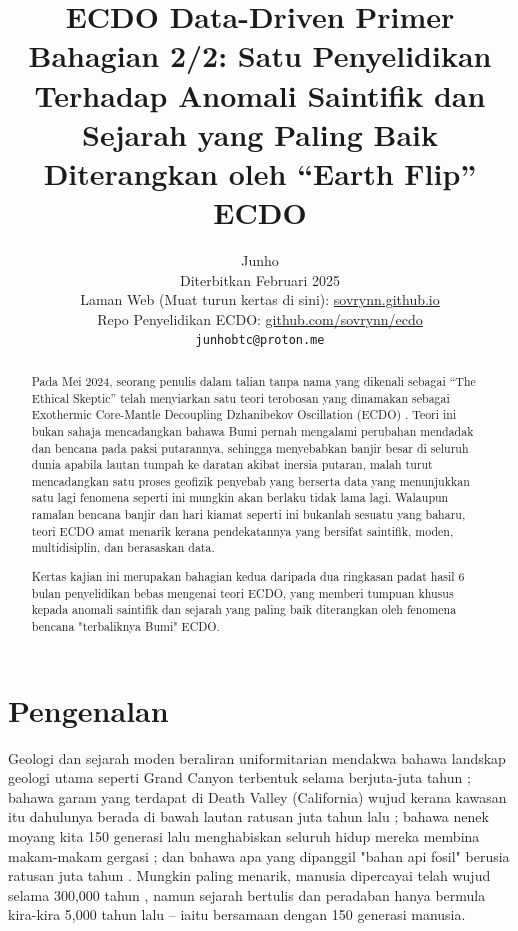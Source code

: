\documentclass[10pt,twocolumn,letterpaper]{article}
\begin{document}
\title{ECDO Data-Driven Primer Bahagian 2/2: Satu Penyelidikan Terhadap Anomali Saintifik dan Sejarah yang Paling Baik Diterangkan oleh “Earth Flip” ECDO}

\author{Junho\\
Diterbitkan Februari 2025\\
Laman Web (Muat turun kertas di sini): \href{https://sovrynn.github.io}{sovrynn.github.io}\\
Repo Penyelidikan ECDO: \href{https://github.com/sovrynn/ecdo}{github.com/sovrynn/ecdo}\\
{\tt\small junhobtc@proton.me}
}

\maketitle

\begin{abstract}
Pada Mei 2024, seorang penulis dalam talian tanpa nama yang dikenali sebagai “The Ethical Skeptic” \cite{0} telah menyiarkan satu teori terobosan yang dinamakan sebagai Exothermic Core-Mantle Decoupling Dzhanibekov Oscillation (ECDO) \cite{1}. Teori ini bukan sahaja mencadangkan bahawa Bumi pernah mengalami perubahan mendadak dan bencana pada paksi putarannya, sehingga menyebabkan banjir besar di seluruh dunia apabila lautan tumpah ke daratan akibat inersia putaran, malah turut mencadangkan satu proses geofizik penyebab yang berserta data yang menunjukkan satu lagi fenomena seperti ini mungkin akan berlaku tidak lama lagi. Walaupun ramalan bencana banjir dan hari kiamat seperti ini bukanlah sesuatu yang baharu, teori ECDO amat menarik kerana pendekatannya yang bersifat saintifik, moden, multidisiplin, dan berasaskan data.

Kertas kajian ini merupakan bahagian kedua daripada dua ringkasan padat hasil 6 bulan penyelidikan bebas \cite{2,20} mengenai teori ECDO, yang memberi tumpuan khusus kepada anomali saintifik dan sejarah yang paling baik diterangkan oleh fenomena bencana "terbaliknya Bumi" ECDO.

\end{abstract}

\section{Pengenalan}

Geologi dan sejarah moden beraliran uniformitarian mendakwa bahawa landskap geologi utama seperti Grand Canyon terbentuk selama berjuta-juta tahun \cite{143}; bahawa garam yang terdapat di Death Valley (California) wujud kerana kawasan itu dahulunya berada di bawah lautan ratusan juta tahun lalu \cite{144}; bahawa nenek moyang kita 150 generasi lalu menghabiskan seluruh hidup mereka membina makam-makam gergasi \cite{29,70}; dan bahawa apa yang dipanggil "bahan api fosil" berusia ratusan juta tahun \cite{104}. Mungkin paling menarik, manusia dipercayai telah wujud selama 300,000 tahun \cite{145}, namun sejarah bertulis dan peradaban hanya bermula kira-kira 5,000 tahun lalu – iaitu bersamaan dengan 150 generasi manusia.
\end{document}

